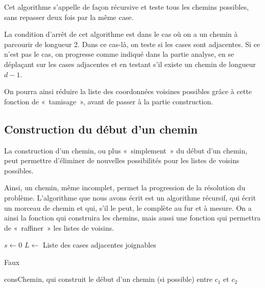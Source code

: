 Cet algorithme s'appelle de façon récursive et teste tous les chemins possibles, sans repasser deux fois par la même case.

La condition d'arrêt de cet algorithme est dans le cas où on a un chemin à parcourir de longueur 2. Dans ce cas-là, on teste si les cases sont adjacentes. Si ce n'est pas le cas, on progresse comme indiqué dans la partie analyse, en se déplaçant sur les cases adjacentes et en testant s'il existe un chemin de longueur $d-1$.

On pourra ainsi réduire la liste des coordonnées voisines possibles grâce à cette fonction de «~tamisage~», avant de passer à la partie construction.

\subsection{Construction du début d'un chemin}

La construction d'un chemin, ou plus «~simplement~» du début d'un chemin, peut permettre d'éliminer de nouvelles possibilités pour les listes de voisins possibles.

Ainsi, un chemin, même incomplet, permet la progression de la résolution du problème. L'algorithme que nous avons écrit est un algorithme récursif, qui écrit un morceau de chemin et qui, s'il le peut, le complète au fur et à mesure. On a ainsi la fonction qui construira les chemins, mais aussi une fonction qui permettra de «~raffiner~» les listes de voisins.

\begin{algorithm}[H]
  {
    $s \gets 0$ \; 
    $L \gets$ Liste des cases adjacentes joignables \;

        {
          \Renvoyer Faux \;
        }
  }
  \caption{consChemin, qui construit le début d'un chemin (si possible) entre $c_1$ et $c_2$}
\end{algorithm}

